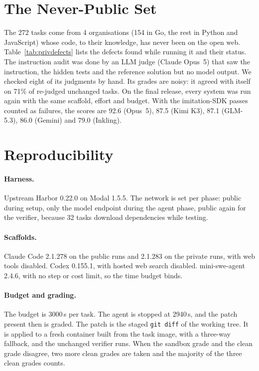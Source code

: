 

\section{The Never-Public Set}
\label{app:private}
The 272 tasks come from 4 organisations (154 in Go, the rest in Python and JavaScript) whose code, to their knowledge, has never been on the open web. Table~\ref{tab:privdefects} lists the defects found while running it and their status. The instruction audit was done by an LLM judge (Claude Opus~5) that saw the instruction, the hidden tests and the reference solution but no model output. We checked eight of its judgments by hand. Its grades are noisy: it agreed with itself on 71\% of re-judged unchanged tasks. On the final release, every system was run again with the same scaffold, effort and budget. With the imitation-SDK passes counted as failures, the scores are 92.6 (Opus~5), 87.5 (Kimi K3), 87.1 (GLM-5.3), 86.0 (Gemini) and 79.0 (Inkling).



\section{Reproducibility}
\label{app:repro}
\paragraph{Harness.} Upstream Harbor 0.22.0 on Modal 1.5.5. The network is set per phase: public during setup, only the model endpoint during the agent phase, public again for the verifier, because 32 tasks download dependencies while testing.
\paragraph{Scaffolds.} Claude Code 2.1.278 on the public runs and 2.1.283 on the private runs, with web tools disabled. Codex 0.155.1, with hosted web search disabled. mini-swe-agent 2.4.6, with no step or cost limit, so the time budget binds.
\paragraph{Budget and grading.} The budget is 3000\,s per task. The agent is stopped at 2940\,s, and the patch present then is graded. The patch is the staged \texttt{git diff} of the working tree. It is applied to a fresh container built from the task image, with a three-way fallback, and the unchanged verifier runs. When the sandbox grade and the clean grade disagree, two more clean grades are taken and the majority of the three clean grades counts.
